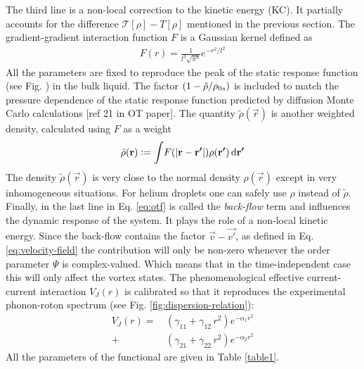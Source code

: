 		The third line is a non-local correction to the kinetic energy (KC). It partially accounts for the difference $\mathcal{T}[\rho]-T[\rho]$ mentioned in the previous section. The gradient-gradient interaction function $F$ is a Gaussian kernel defined as
		\begin{align}
			F(r) = \frac{1}{l^3\sqrt{\pi^3}}\unit{e}^{-r^2/l^2}
		\end{align}
		All the parameters are fixed to reproduce the peak of the static response function (see Fig.  ) in the bulk liquid. The factor $\qty(1-\tilde{\rho}/\rho_{0s})$ is included to match the pressure dependence of the static response function predicted by diffusion Monte Carlo calculations [ref 21 in OT paper]. The quantity $\tilde{\rho}(\vec{r})$ is another weighted density, calculated using $F$ as a weight
		\begin{align}
			\tilde{\rho}(\bm{\mathrm{r}}) \vcentcolon= \int\!F\qty(\abs{\bm{\mathrm{r}}-\bm{\mathrm{r'}}})\rho(\bm{\mathrm{r'}})\,\mathrm{d}{\bm{\mathrm{r'}}}
		\end{align}
		The density $\tilde{\rho}(\vec{r})$ is very close to the normal density $\rho(\vec{r})$ except in very inhomogeneous situations. For helium droplets one can safely use $\rho$ instead of $\tilde{\rho}$.\\
			
		Finally, in the last line in Eq. \ref{eq:otf} is called the \emph{back-flow} term and influences the dynamic response of the system. It plays the role of a non-local kinetic energy. Since the back-flow contains the factor $\vec{v}-\vec{v'}$, as defined in Eq. \ref{eq:velocity-field} the contribution will only be non-zero whenever the order parameter $\Psi$ is complex-valued. Which means that in the time-independent case this will only affect the vortex states. The phenomenological effective current-current interaction $V_J(r)$ is calibrated so that it reproduces the experimental phonon-roton spectrum (see Fig. \ref{fig:dispersion-relation}):
		\begin{align}
			V_J(r) =\,&(\gamma_{11} +\gamma_{12} \, r^2) e^{-\alpha_1 r^2} \nonumber \\
				+\,&(\gamma_{21} +\gamma_{22} \, r^2) e^{-\alpha_2 r^2}
		\end{align}
		All the parameters of the functional are given in Table \ref{table1}.

